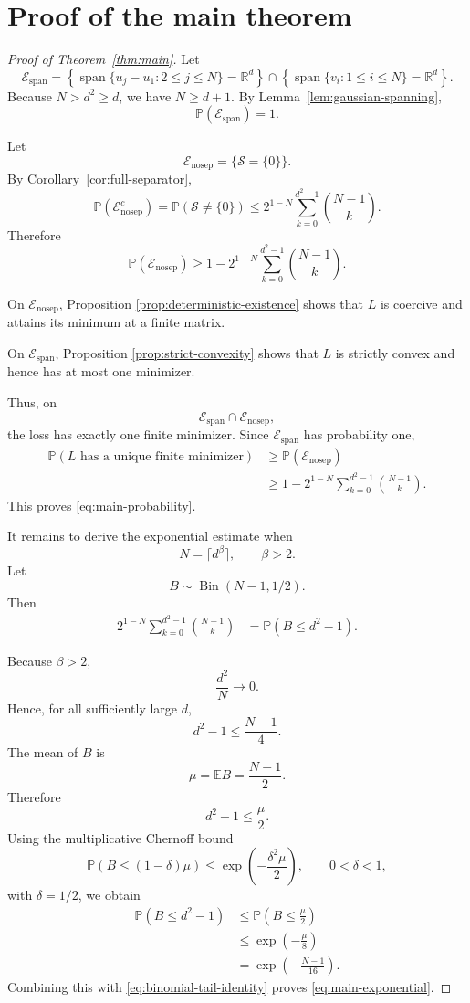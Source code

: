 \documentclass[11pt]{article}
\newcommand{\R}{\mathbb{R}}
\newcommand{\cS}{\mathcal{S}}
\newcommand{\E}{\mathbb{E}}
\newcommand{\Pp}{\mathbb{P}}
\newcommand{\1}{\mathbf{1}}
\newcommand{\Span}{\operatorname{span}}
\begin{document}
\section{Proof of the main theorem}

\begin{proof}[Proof of Theorem~\ref{thm:main}]
Let
\[
\mathcal{E}_{\mathrm{span}}
=
\left\{
\Span\{u_j-u_1:2\le j\le N\}=\R^d
\right\}
\cap
\left\{
\Span\{v_i:1\le i\le N\}=\R^d
\right\}.
\]
Because \(N>d^2\ge d\), we have \(N\ge d+1\). By
Lemma~\ref{lem:gaussian-spanning},
\[
\Pp(\mathcal{E}_{\mathrm{span}})=1.
\]

Let
\[
\mathcal{E}_{\mathrm{nosep}}
=
\{\cS=\{0\}\}.
\]
By Corollary~\ref{cor:full-separator},
\[
\Pp(\mathcal{E}_{\mathrm{nosep}}^c)
=
\Pp(\cS\neq\{0\})
\le
2^{1-N}
\sum_{k=0}^{d^2-1}\binom{N-1}{k}.
\]
Therefore
\[
\Pp(\mathcal{E}_{\mathrm{nosep}})
\ge
1-
2^{1-N}
\sum_{k=0}^{d^2-1}\binom{N-1}{k}.
\]

On \(\mathcal{E}_{\mathrm{nosep}}\), Proposition
\ref{prop:deterministic-existence} shows that \(L\) is coercive and
attains its minimum at a finite matrix.

On \(\mathcal{E}_{\mathrm{span}}\), Proposition
\ref{prop:strict-convexity} shows that \(L\) is strictly convex and hence
has at most one minimizer.

Thus, on
\[
\mathcal{E}_{\mathrm{span}}
\cap
\mathcal{E}_{\mathrm{nosep}},
\]
the loss has exactly one finite minimizer. Since
\(\mathcal{E}_{\mathrm{span}}\) has probability one,
\begin{align*}
\Pp\left(
L\text{ has a unique finite minimizer}
\right)
&\ge
\Pp(\mathcal{E}_{\mathrm{nosep}})
\\
&\ge
1-
2^{1-N}
\sum_{k=0}^{d^2-1}\binom{N-1}{k}.
\end{align*}
This proves \eqref{eq:main-probability}.

It remains to derive the exponential estimate when
\[
N=\lceil d^\beta\rceil,
\qquad
\beta>2.
\]
Let
\[
B\sim\operatorname{Bin}(N-1,1/2).
\]
Then
\begin{align}
2^{1-N}
\sum_{k=0}^{d^2-1}\binom{N-1}{k}
&=
\Pp(B\le d^2-1).
\label{eq:binomial-tail-identity}
\end{align}

Because \(\beta>2\),
\[
\frac{d^2}{N}
\longrightarrow 0.
\]
Hence, for all sufficiently large \(d\),
\[
d^2-1
\le
\frac{N-1}{4}.
\]
The mean of \(B\) is
\[
\mu=\E B=\frac{N-1}{2}.
\]
Therefore
\[
d^2-1
\le
\frac{\mu}{2}.
\]
Using the multiplicative Chernoff bound
\[
\Pp(B\le(1-\delta)\mu)
\le
\exp\left(-\frac{\delta^2\mu}{2}\right),
\qquad
0<\delta<1,
\]
with \(\delta=1/2\), we obtain
\begin{align*}
\Pp(B\le d^2-1)
&\le
\Pp\left(B\le\frac{\mu}{2}\right)
\\
&\le
\exp\left(-\frac{\mu}{8}\right)
\\
&=
\exp\left(-\frac{N-1}{16}\right).
\end{align*}
Combining this with \eqref{eq:binomial-tail-identity} proves
\eqref{eq:main-exponential}.
\end{proof}
\end{document}
